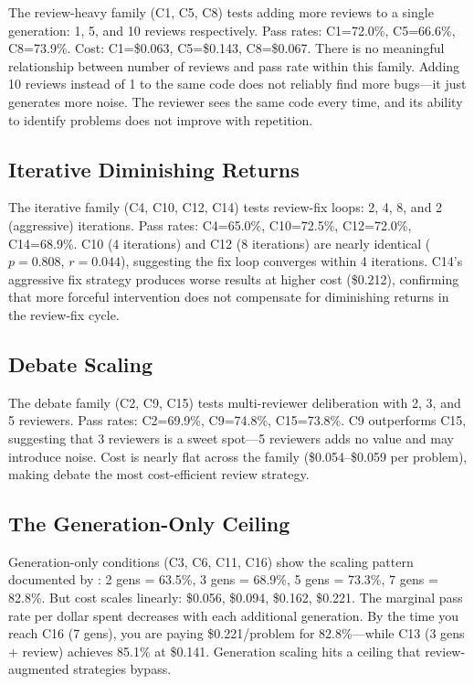 \documentclass{article}
\begin{document}
The review-heavy family (C1, C5, C8) tests adding more reviews to a single generation: 1, 5, and 10 reviews respectively. Pass rates: C1=72.0\%, C5=66.6\%, C8=73.9\%. Cost: C1=\$0.063, C5=\$0.143, C8=\$0.067. There is no meaningful relationship between number of reviews and pass rate within this family. Adding 10 reviews instead of 1 to the same code does not reliably find more bugs---it just generates more noise. The reviewer sees the same code every time, and its ability to identify problems does not improve with repetition.

\subsection{Iterative Diminishing Returns}

The iterative family (C4, C10, C12, C14) tests review-fix loops: 2, 4, 8, and 2 (aggressive) iterations. Pass rates: C4=65.0\%, C10=72.5\%, C12=72.0\%, C14=68.9\%. C10 (4 iterations) and C12 (8 iterations) are nearly identical ($p=0.808$, $r=0.044$), suggesting the fix loop converges within 4 iterations. C14's aggressive fix strategy produces worse results at higher cost (\$0.212), confirming that more forceful intervention does not compensate for diminishing returns in the review-fix cycle.

\subsection{Debate Scaling}

The debate family (C2, C9, C15) tests multi-reviewer deliberation with 2, 3, and 5 reviewers. Pass rates: C2=69.9\%, C9=74.8\%, C15=73.8\%. C9 outperforms C15, suggesting that 3 reviewers is a sweet spot---5 reviewers adds no value and may introduce noise. Cost is nearly flat across the family (\$0.054--\$0.059 per problem), making debate the most cost-efficient review strategy.

\subsection{The Generation-Only Ceiling}

Generation-only conditions (C3, C6, C11, C16) show the scaling pattern documented by \citet{brown2024monkeys}: 2 gens = 63.5\%, 3 gens = 68.9\%, 5 gens = 73.3\%, 7 gens = 82.8\%. But cost scales linearly: \$0.056, \$0.094, \$0.162, \$0.221. The marginal pass rate per dollar spent decreases with each additional generation. By the time you reach C16 (7 gens), you are paying \$0.221/problem for 82.8\%---while C13 (3 gens + review) achieves 85.1\% at \$0.141. Generation scaling hits a ceiling that review-augmented strategies bypass.
\end{document}
